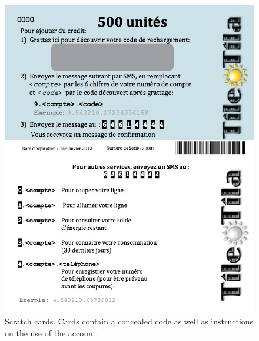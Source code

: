\documentclass[conference]{IEEEtran}
\begin{document}
\begin{figure}[]
\begin{center}
\includegraphics[width=\columnwidth]{figures/scratchCards.jpg}
\end{center}
\caption{Scratch cards.  Cards contain a concealed code as well as instructions on the
use of the account.}
\label{scratchCards}
\end{figure}






\end{document}

